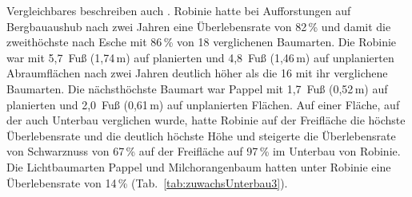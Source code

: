 \documentclass[twocolumn]{scrartcl}
\begin{document}
\begin{table}[htbp]
  \centering
  \caption{Überlebensraten und Höhen von unterbauten Baumarten nach \citet{chapman1951robinieSchirm}}
  \label{tab:zuwachsUnterbau2}
\end{table}

Vergleichbares beschreiben auch
\citet{limstrom1951schuttaufforstung}. Robinie hatte bei Aufforstungen
auf Bergbauaushub nach zwei Jahren eine Überlebensrate von 82\,\% und
damit die zweithöchste nach Esche mit 86\,\% von 18 verglichenen
Baumarten. Die Robinie war mit 5,7~Fuß (1,74\,m) auf planierten und
4,8~Fuß (1,46\,m) auf unplanierten Abraumflächen nach zwei Jahren
deutlich höher als die 16 mit ihr verglichene Baumarten. Die
nächsthöchste Baumart war Pappel mit 1,7~Fuß (0,52\,m) auf planierten
und 2,0~Fuß (0,61\,m) auf unplanierten Flächen. Auf einer Fläche, auf
der auch Unterbau verglichen wurde, hatte Robinie auf der Freifläche
die höchste Überlebensrate und die deutlich höchste Höhe und steigerte
die Überlebensrate von Schwarznuss von 67\,\% auf der Freifläche auf
97\,\% im Unterbau von Robinie. Die Lichtbaumarten Pappel und
Milchorangenbaum hatten unter Robinie eine Überlebensrate von 14\,\%
(Tab.~\ref{tab:zuwachsUnterbau3}).
\end{document}
